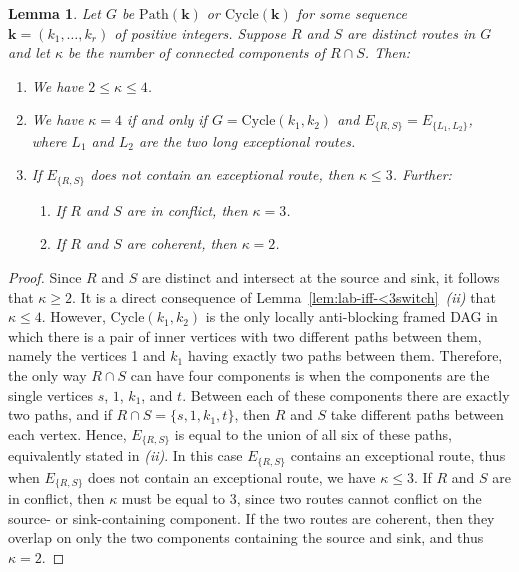 \documentclass[12pt]{amsart}
\newtheorem{lemma}[theorem]{Lemma}
\theoremstyle{definition}
\newcommand\bk{\mathbf{k}}
\newcommand\Path{\mathrm{Path}}
\newcommand\Cycle{\mathrm{Cycle}}
\begin{document}
\begin{lemma}\label{lem:number-components-of-route-intersection}
    Let $G$ be $\Path(\bk)$ or $\Cycle(\bk)$ for some sequence $\bk = (k_1, \dots, k_r)$ of positive integers. Suppose $R$ and $S$ are distinct routes in $G$ and let $\kappa$ be the number of connected components of $R\cap S$. Then:
    \begin{enumerate}[label=(\roman*)]
        \item We have $2\leq \kappa\leq 4$.
        \item We have $\kappa=4$ if and only if $G = \Cycle(k_1, k_2)$ and $E_{\{R,S\}} = E_{\{L_1, L_2\}}$, where $L_1$ and $L_2$ are the two long exceptional routes. 
        \item If $E_{\{R,S\}}$ does not contain an exceptional route, then $\kappa\leq 3$. 
        Further:
        \begin{enumerate}
        \item If $R$ and $S$ are in conflict, then $\kappa=3$.
        \item If $R$ and $S$ are coherent, then $\kappa=2$.
        \end{enumerate}
    \end{enumerate}
\end{lemma}
\begin{proof}
    Since $R$ and $S$ are distinct and intersect at the source and sink, it follows that $\kappa\geq 2$. It is a direct consequence of Lemma~\ref{lem:lab-iff-<3switch}~\emph{(ii)} that $\kappa\leq 4$. 
    However, $\Cycle(k_1,k_2)$ is the only locally anti-blocking framed DAG in which there is a pair of inner vertices with two different paths between them, namely the vertices 1 and $k_1$ having exactly two paths between them. 
    Therefore, the only way $R\cap S$ can have four components is when the components are the single vertices $s$, $1$, $k_1$, and $t$. 
    Between each of these components there are exactly two paths, and if $R\cap S = \{s,1,k_1,t\}$, then $R$ and $S$ take different paths between each vertex. Hence, $E_{\{R,S\}}$ is equal to the union of all six of these paths, equivalently stated in \emph{(ii)}.
    In this case $E_{\{R,S\}}$ contains an exceptional route, thus when $E_{\{R,S\}}$ does not contain an exceptional route, we have $\kappa\leq 3$. 
    If $R$ and $S$ are in conflict, then $\kappa$ must be equal to $3$, since two routes cannot conflict on the source- or sink-containing component.
    If the two routes are coherent, then they overlap on only the two components containing the source and sink, and thus $\kappa=2$.
\end{proof}
\end{document}
